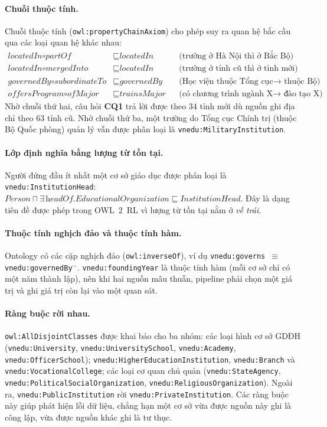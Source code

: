 \documentclass[12pt,a4paper]{article}
\newcommand{\vn}[1]{\texttt{vnedu:\allowbreak #1}}
\newcommand{\CQ}[1]{\textbf{CQ#1}}
\begin{document}
\paragraph{Chuỗi thuộc tính.} Chuỗi thuộc tính (\texttt{owl:propertyChainAxiom}) cho phép suy ra quan hệ bắc cầu qua
các loại quan hệ khác nhau:
\begin{align*}
\textit{locatedIn} \circ \textit{partOf} &\sqsubseteq \textit{locatedIn} && \text{(trường ở Hà Nội thì ở Bắc Bộ)}\\
\textit{locatedIn} \circ \textit{mergedInto} &\sqsubseteq \textit{locatedIn} && \text{(trường ở tỉnh cũ thì ở tỉnh mới)}\\
\textit{governedBy} \circ \textit{subordinateTo} &\sqsubseteq \textit{governedBy} && \text{(Học viện thuộc Tổng cục
\(\to\) thuộc Bộ)}\\
\textit{offersProgram} \circ \textit{ofMajor} &\sqsubseteq \textit{trainsMajor} && \text{(có chương trình ngành X
\(\to\) đào tạo X)}
\end{align*}
Nhờ chuỗi thứ hai, câu hỏi \CQ{1} trả lời được theo 34 tỉnh mới dù nguồn ghi địa chỉ theo 63 tỉnh cũ. Nhờ chuỗi thứ
ba, một trường do Tổng cục Chính trị (thuộc Bộ Quốc phòng) quản lý vẫn được phân loại là \vn{MilitaryInstitution}.

\paragraph{Lớp định nghĩa bằng lượng từ tồn tại.} Người đứng đầu ít nhất một cơ sở giáo dục được phân loại là
\vn{InstitutionHead}:
\(\textit{Person} \sqcap \exists\,\textit{headOf}.\textit{EducationalOrganization} \sqsubseteq
\textit{InstitutionHead}\). Đây là dạng tiên đề được phép trong OWL~2~RL vì lượng từ tồn tại nằm ở \emph{vế trái}.

\paragraph{Thuộc tính nghịch đảo và thuộc tính hàm.} Ontology có các cặp nghịch đảo (\texttt{owl:inverseOf}), ví dụ
\vn{governs}~\(\equiv\) \vn{governedBy}\(^{-}\). \vn{foundingYear} là thuộc tính hàm (mỗi cơ sở chỉ có một năm thành
lập), nên khi hai nguồn mâu thuẫn, pipeline phải chọn một giá trị và ghi giá trị còn lại vào một quan sát.

\paragraph{Ràng buộc rời nhau.} \texttt{owl:AllDisjointClasses} được khai báo cho ba nhóm: các loại hình cơ sở GDĐH
(\vn{University}, \vn{UniversitySchool}, \vn{Academy}, \vn{OfficerSchool}); \vn{HigherEducationInstitution},
\vn{Branch} và \vn{VocationalCollege}; các loại cơ quan chủ quản (\vn{StateAgency},
\vn{PoliticalSocialOrganization}, \vn{ReligiousOrganization}). Ngoài ra, \vn{PublicInstitution} rời
\vn{PrivateInstitution}. Các ràng buộc này giúp phát hiện lỗi dữ liệu, chẳng hạn một cơ sở vừa được nguồn này ghi là
công lập, vừa được nguồn khác ghi là tư thục.
\end{document}
